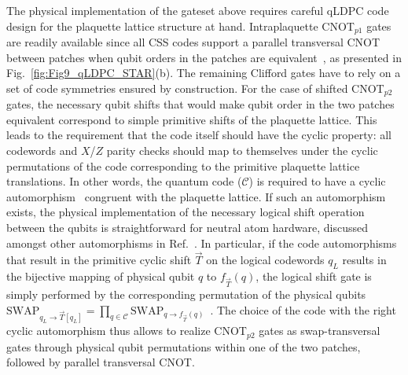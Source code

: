\documentclass[aps, prx, reprint, superscriptaddress, longbibliography, floatfix]{revtex4-2}
\begin{document}
The physical implementation of the gateset above requires careful qLDPC code design for the plaquette lattice structure at hand. Intraplaquette CNOT$_{p1}$ gates are readily available since all CSS codes support a parallel transversal CNOT between patches when qubit orders in the patches are equivalent~\cite{Calderbank1997}, as presented in Fig.~\ref{fig:Fig9_qLDPC_STAR}(b). The remaining Clifford gates have to rely on a set of code symmetries ensured by construction. For the case of shifted CNOT$_{p2}$ gates, the necessary qubit shifts that would make qubit order in the two patches equivalent correspond to simple primitive shifts of the plaquette lattice. This leads to the requirement that the code itself should have the cyclic property: all codewords and $X$/$Z$ parity checks should map to themselves under the cyclic permutations of the code corresponding to the primitive plaquette lattice translations. In other words, the quantum code ($\mathcal{C}$) is required to have a cyclic automorphism~\cite{eberhardt2024, Breuckmann2024, Xu2025} congruent with the plaquette lattice. If such an automorphism exists, the physical implementation of the necessary logical shift operation between the qubits is straightforward for neutral atom hardware, discussed amongst other automorphisms in Ref.~\cite{Xu2025}. In particular, if the code automorphisms that result in the primitive cyclic shift $\vec{T}$ on the logical codewords $q_L$ results in the bijective mapping of physical qubit $q$ to $f_{\vec{T}}(q)$, the logical shift gate is simply performed by the corresponding permutation of the physical qubits $\textrm{SWAP}_{q_L \rightarrow \vec{T} [q_L]}=\prod_{q \in \mathcal{C}} \textrm{SWAP}_{q \rightarrow f_{\vec{T}}(q) }$~\cite{eberhardt2024}. The choice of the code with the right cyclic automorphism thus allows to realize CNOT$_{p2}$ gates as swap-transversal gates through physical qubit permutations within one of the two patches, followed by parallel transversal CNOT.
\end{document}
